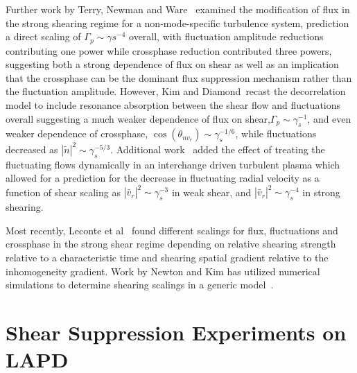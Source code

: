 \documentclass[aip,pop,amsmath,amssymb,preprint,superscriptaddress]{revtex4-1} %
\begin{document}
Further work by Terry, Newman and Ware~\cite{terry01} examined the modification of flux in the strong shearing regime for a non-mode-specific turbulence system, prediction a direct scaling of $\Gamma_{p} \sim \gamma{s}^{-4}$ overall, with fluctuation amplitude reductions contributing one power while crossphase reduction contributed three powers, suggesting both a strong dependence of flux on shear as well as an implication that the crossphase can be the dominant flux suppression mechanism rather than the fluctuation amplitude. However, Kim and Diamond~\cite{kim03}recast the decorrelation model to include resonance absorption between the shear flow and fluctuations overall suggesting a much weaker dependence of flux on shear,$\Gamma_{p} \sim \gamma_{s}^{-1}$, and even weaker dependence of crossphase, $\cos(\theta_{nv_{r}}) \sim \gamma_{s}^{-1/6}$, while fluctuations decreased as $|\tilde{n}|^{2} \sim \gamma_{s}^{-5/3}$. Additional work~\cite{kim04} added the effect of treating the fluctuating flows dynamically in an interchange driven turbulent plasma which allowed for a prediction for the decrease in fluctuating radial velocity as a function of shear scaling as $|\tilde{v_{r}}|^{2} \sim \gamma_{s}^{-3}$ in weak shear, and $|\tilde{v_{r}}|^{2} \sim \gamma_{s}^{-4}$ in strong shearing.

Most recently, Leconte et al~\cite{leconte06} found different scalings for flux, fluctuations and crossphase in the strong shear regime depending on relative shearing strength relative to a characteristic time and shearing spatial gradient relative to the inhomogeneity gradient. Work by Newton and Kim has utilized numerical simulations to determine shearing scalings in a generic model~\cite{newton07,newton11}.

\section{Shear Suppression Experiments on LAPD}
\end{document}
